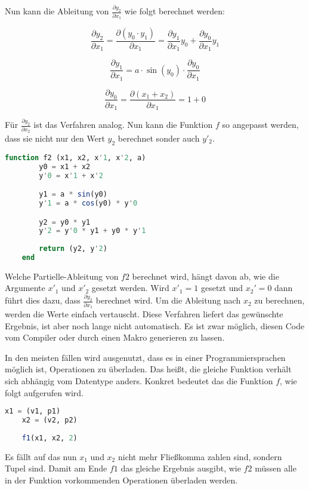 Nun kann die Ableitung von $\frac{\partial y_2}{\partial x_1}$ wie folgt berechnet werden:

$$
	\frac{\partial y_2}{\partial x_1} = \frac{\partial (y_0 \cdot y_1)}{\partial x_1} = \frac{\partial  y_1}{\partial x_1} y_0  + \frac{\partial y_0 }{\partial x_1} y_1
$$

$$
	\frac{\partial y_1}{ \partial x_1 } = a \cdot \sin(y_0) \cdot \frac{\partial y_0}{\partial x_1}
$$

$$
	\frac{\partial y_0}{\partial x_1} = \frac{\partial (x_1 + x_2)}{\partial x_1} = 1 + 0
$$

Für $\frac{\partial y_2}{\partial x_2}$ ist das Verfahren analog. 
Nun kann die Funktion $f$ so angepasst werden, dass sie nicht nur den Wert $y_2$ berechnet sonder auch $y'_2$.

\begin{lstlisting}[language=Julia]
    function f2 (x1, x2, x'1, x'2, a)
        y0 = x1 + x2
        y'0 = x'1 + x'2

        y1 = a * sin(y0)
        y'1 = a * cos(y0) * y'0

		y2 = y0 * y1
        y'2 = y'0 * y1 + y0 * y'1
        
        return (y2, y'2)
    end
\end{lstlisting}

Welche Partielle-Ableitung von $f2$ berechnet wird, hängt davon ab, wie die Argumente $x'_1$ und $x'_2$ gesetzt werden.
Wird $x'_1 = 1$ gesetzt und $x_2' = 0$ dann führt dies dazu, dass $\frac{\partial y_2}{\partial x_1}$ berechnet wird.
Um die Ableitung nach $x_2$ zu berechnen, werden die Werte einfach vertauscht.
Diese Verfahren liefert das gewünschte Ergebnis, ist aber noch lange nicht automatisch.
Es ist zwar möglich, diesen Code vom Compiler oder durch einen Makro generieren zu lassen.

In den meisten fällen wird ausgenutzt, dass es in einer 
Programmiersprachen möglich ist, Operationen zu überladen.
Das heißt, die gleiche Funktion verhält sich abhängig vom Datentype anders.
Konkret bedeutet das die Funktion $f$, wie folgt aufgerufen wird.

\begin{lstlisting}[language=Julia]
	x1 = (v1, p1)
    x2 = (v2, p2)
    
    f1(x1, x2, 2)
\end{lstlisting}

Es fällt auf das nun $x_1$ und $x_2$ nicht mehr Fließkomma zahlen sind, sondern Tupel sind.
Damit am Ende $f1$ das gleiche Ergebnis ausgibt, wie $f2$ müssen alle in der Funktion vorkommenden Operationen überladen werden.

